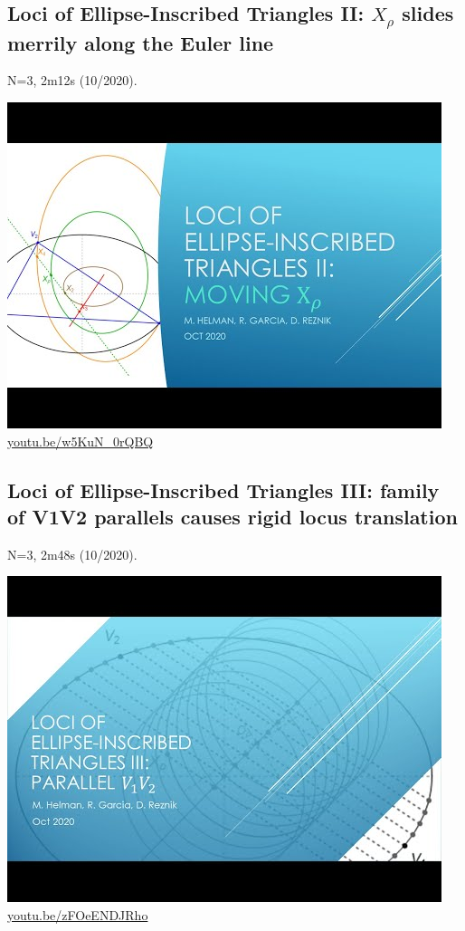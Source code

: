 \documentclass[12pt]{amsart}
\begin{document}
\subsection{Loci of Ellipse-Inscribed Triangles II: $X_\rho$ slides merrily along the Euler line}
\label{vid:w5KuN_0rQBQ}
\noindent N=3, 2m12s (10/2020). 
\begin{center}\includegraphics[width=.5\textwidth]{pics/w5KuN_0rQBQ.jpg} \\ 
\href{https://youtu.be/w5KuN_0rQBQ}{\url{youtu.be/w5KuN\_0rQBQ}}\end{center}
% 

\subsection{Loci of Ellipse-Inscribed Triangles III: family of V1V2 parallels causes rigid locus translation}
\label{vid:zFOeENDJRho}
\noindent N=3, 2m48s (10/2020). 
\begin{center}\includegraphics[width=.5\textwidth]{pics/zFOeENDJRho.jpg} \\ 
\href{https://youtu.be/zFOeENDJRho}{\url{youtu.be/zFOeENDJRho}}\end{center}
% 
\end{document}
